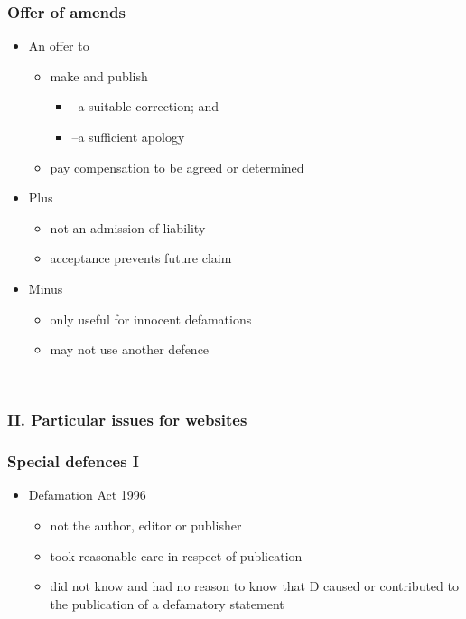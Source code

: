 \documentclass[ignorenonframetext,]{beamer}
\begin{document}
\begin{frame}
\frametitle{Offer of amends}

\begin{itemize}
\item  An offer to

  \begin{itemize}
  \item    make and publish

    \begin{itemize}
    \item      {--}a suitable correction; and
    \item      {--}a sufficient apology
    \end{itemize}
  \item    {pay }{compensation to be agreed or determined}
  \end{itemize}
\item  {Plus}

  \begin{itemize}
  \item    {not an admission of liability}
  \item    {acceptance prevents future claim}
  \end{itemize}
\item  {Minus}

  \begin{itemize}
  \item    {only useful for innocent defamations}
  \item    {may not use another defence}
  \end{itemize}
\end{itemize}

~


\end{frame}

\begin{frame}
\frametitle{II. Particular issues for websites}
\end{frame}

\begin{frame}
\frametitle{Special defences I}

\begin{itemize}
\item  Defamation Act 1996

  \begin{itemize}
  \item    not the author, editor or publisher
  \item    took reasonable care in respect of publication
  \item    did not know and had no reason to know that D caused or
    contributed to the publication of a defamatory statement
  \end{itemize}
\end{itemize}

~


\end{frame}
\end{document}
